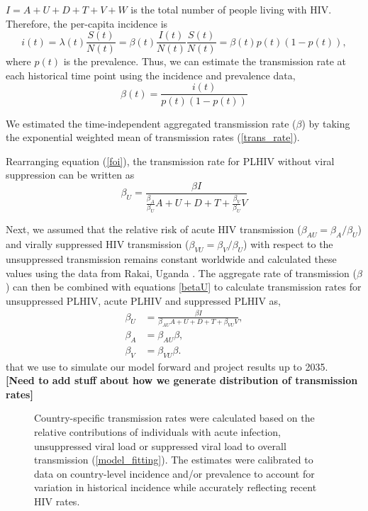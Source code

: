 \documentclass[11pt]{article}
\newcommand{\comment}[1]{\textbf{[#1]}}
\begin{document}
$I = A+U+D+T+V+W$ is the total number of people living with HIV. Therefore, the per-capita
incidence is
\begin{equation}
i(t) = \lambda(t) \frac{S(t)}{N(t)}
= \beta(t) \frac{I(t)}{N(t)} \frac{S(t)}{N(t)} =\beta(t) p(t) (1-p(t)),
\end{equation}
where $p(t)$ is the prevalence. Thus, we can estimate the
transmission rate at each historical time point using the incidence
and prevalence data,
\begin{equation}
  \label{trans_rate}
  \beta(t) = \frac{i(t)}{p(t)(1-p(t))}
\end{equation}


We estimated the time-independent aggregated transmission rate ($\beta$)
by taking the exponential weighted mean of transmission rates
(\ref{trans_rate}).


Rearranging equation (\ref{foi}), the transmission rate for PLHIV
without viral suppression can be written as
\begin{equation}
\label{betaU}
  \beta_{U} = \frac{\beta I}{\frac{\beta_{A}}{\beta_{U}}A +
    U+D+T+\frac{\beta_{V}}{\beta_{U}}V}
\end{equation}


Next, we assumed that the relative risk of acute HIV transmission
($\beta_{AU} = \beta_{A}/\beta_{U}$) and virally suppressed HIV
transmission ($\beta_{VU} = \beta_{V}/\beta_{U}$) with respect to the
unsuppressed transmission remains constant worldwide and calculated
these values using the data from Rakai, Uganda \cite{Wawer2005-us}. The aggregate
rate of transmission ($\beta$) can then be combined with equations \ref{betaU} to calculate transmission
rates for unsuppressed PLHIV, acute PLHIV and suppressed PLHIV as,
\begin{align}
  \beta_{U} & = \frac{\beta I}{\beta_{AU}A +
              U+D+T+\beta_{VU}V}, \\
  \beta_{A} & = \beta_{AU}\beta, \\
  \beta_{V} & = \beta_{VU} \beta.
\end{align}
that we use to simulate our model forward and project results up to 2035.
\\

\comment{Need to add stuff about how we generate distribution of
  transmission rates}




\begin{figure}
  \centering
  \caption{Country-specific transmission rates were calculated based
    on the relative contributions of individuals with acute infection,
    unsuppressed viral load or suppressed viral load to overall
    transmission (\autoref{model_fitting}). The estimates were
    calibrated to data on country-level incidence and/or prevalence to
    account for variation in historical incidence while accurately
    reflecting recent HIV rates.}
  \label{transmission_rate}
\end{figure}
\end{document}
